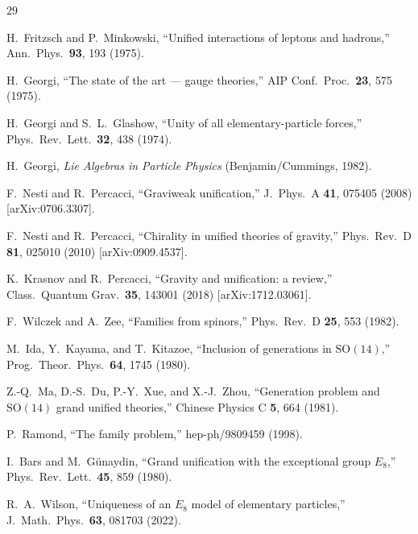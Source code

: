 \documentclass[aps,prl,twocolumn,showpacs,preprintnumbers,superscriptaddress,floatfix]{revtex4-2}
\begin{document}
\begin{thebibliography}{29}


H.~Fritzsch and P.~Minkowski,
``Unified interactions of leptons and hadrons,''
Ann.\ Phys.\ \textbf{93}, 193 (1975).

H.~Georgi,
``The state of the art --- gauge theories,''
AIP Conf.\ Proc.\ \textbf{23}, 575 (1975).

H.~Georgi and S.~L.~Glashow,
``Unity of all elementary-particle forces,''
Phys.\ Rev.\ Lett.\ \textbf{32}, 438 (1974).

H.~Georgi,
\textit{Lie Algebras in Particle Physics}
(Benjamin/Cummings, 1982).


F.~Nesti and R.~Percacci,
``Graviweak unification,''
J.\ Phys.\ A \textbf{41}, 075405 (2008)
[arXiv:0706.3307].

F.~Nesti and R.~Percacci,
``Chirality in unified theories of gravity,''
Phys.\ Rev.\ D \textbf{81}, 025010 (2010)
[arXiv:0909.4537].

K.~Krasnov and R.~Percacci,
``Gravity and unification: a review,''
Class.\ Quantum Grav.\ \textbf{35}, 143001 (2018)
[arXiv:1712.03061].


F.~Wilczek and A.~Zee,
``Families from spinors,''
Phys.\ Rev.\ D \textbf{25}, 553 (1982).

M.~Ida, Y.~Kayama, and T.~Kitazoe,
``Inclusion of generations in $\mathrm{SO}(14)$,''
Prog.\ Theor.\ Phys.\ \textbf{64}, 1745 (1980).

Z.-Q.~Ma, D.-S.~Du, P.-Y.~Xue, and X.-J.~Zhou,
``Generation problem and $\mathrm{SO}(14)$ grand unified theories,''
Chinese Physics C \textbf{5}, 664 (1981).

P.~Ramond,
``The family problem,''
hep-ph/9809459 (1998).


I.~Bars and M.~G\"unaydin,
``Grand unification with the exceptional group $E_8$,''
Phys.\ Rev.\ Lett.\ \textbf{45}, 859 (1980).

R.~A.~Wilson,
``Uniqueness of an $E_8$ model of elementary particles,''
J.\ Math.\ Phys.\ \textbf{63}, 081703 (2022).


\end{thebibliography}
\end{document}
